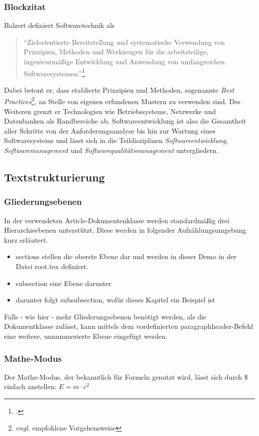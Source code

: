   \subsubsection{Blockzitat}
    Balzert definiert Softwaretechnik als
    \begin{quotation}
      "`Zielorientierte Bereitstellung und systematische Verwendung von Prinzipien, Methoden und Werkzeugen 
      für die arbeitsteilige, ingenieurmäßige Entwicklung und Anwendung von umfangreichen Softwaresystemen."'\footcite[S. 17]{balzert2009lehrbuch}    
    \end{quotation}
    Dabei betont er, dass etablierte Prinzipien und Methoden, sogenannte 
    \emph{Best Practices}\footnote{\emph{engl.} empfohlene Vorgehensweise},
    an Stelle von eigenen erfundenen Mustern zu verwenden sind.
    Des Weiteren grenzt er Technologien wie Betriebssysteme, Netzwerke und Datenbanken als Randbereiche ab. 
    Softwareentwicklung ist also die Gesamtheit aller Schritte von der Anforderungsanalyse bis hin zur Wartung eines Softwaresystems
    und lässt sich in die Teildisziplinen \emph{Softwareentwicklung}, \emph{Softwaremanagement} und \emph{Softwarequalitätsmanagement} untergliedern.

\subsection{Textstrukturierung}
  \subsubsection{Gliederungsebenen}
    In der verwendeten Article-Dokumentenklasse werden standardmäßig drei Hierarchieebenen unterstützt.
    Diese werden in folgender Aufzählungsumgebung kurz erläutert.
    
    \begin{itemize}
      \item sections stellen die oberste Ebene dar und werden in dieser Demo in der Datei root.tex definiert.
      \item subsection eine Ebene darunter
      \item darunter folgt subsubsection, wofür dieses Kapitel ein Beispiel ist 
    \end{itemize}

    Falls - wie hier - mehr Gliederungsebenen benötigt werden, als die Dokumentklasse zulässt, 
    kann mittels dem vordefinierten paragraphheader-Befehl eine weitere, unnummerierte Ebene eingefügt werden.
   
  \subsubsection{Mathe-Modus}
    Der Mathe-Modus, der bekanntlich für Formeln genutzt wird, lässt sich durch \$ einfach anstellen:
    $E = m \cdot c^2$